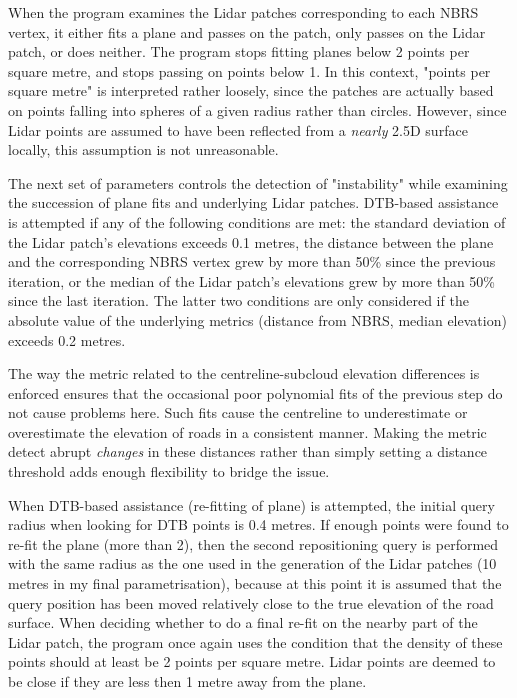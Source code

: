 When the program examines the Lidar patches corresponding to each NBRS vertex, it either fits a plane and passes on the patch, only passes on the Lidar patch, or does neither. The program stops fitting planes below 2 points per square metre, and stops passing on points below 1. In this context, "points per square metre" is interpreted rather loosely, since the patches are actually based on points falling into spheres of a given radius rather than circles. However, since Lidar points are assumed to have been reflected from a \textit{nearly} 2.5D surface locally, this assumption is not unreasonable.

The next set of parameters controls the detection of "instability" while examining the succession of plane fits and underlying Lidar patches. DTB-based assistance is attempted if any of the following conditions are met: the standard deviation of the Lidar patch's elevations exceeds 0.1 metres, the distance between the plane and the corresponding NBRS vertex grew by more than 50\% since the previous iteration, or the median of the Lidar patch's elevations grew by more than 50\% since the last iteration. The latter two conditions are only considered if the absolute value of the underlying metrics (distance from NBRS, median elevation) exceeds 0.2 metres.

The way the metric related to the centreline-subcloud elevation differences is enforced ensures that the occasional poor polynomial fits of the previous step do not cause problems here. Such fits cause the centreline to underestimate or overestimate the elevation of roads in a consistent manner. Making the metric detect abrupt \textit{changes} in these distances rather than simply setting a distance threshold adds enough flexibility to bridge the issue.

When DTB-based assistance (re-fitting of plane) is attempted, the initial query radius when looking for DTB points is 0.4 metres. If enough points were found to re-fit the plane (more than 2), then the second repositioning query is performed with the same radius as the one used in the generation of the Lidar patches (10 metres in my final parametrisation), because at this point it is assumed that the query position has been moved relatively close to the true elevation of the road surface. When deciding whether to do a final re-fit on the nearby part of the Lidar patch, the program once again uses the condition that the density of these points should at least be 2 points per square metre. Lidar points are deemed to be close if they are less then 1 metre away from the plane.

